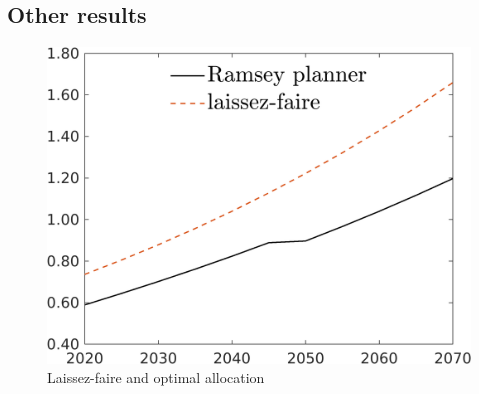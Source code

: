 \subsection{Other results}
\begin{figure}[h!!]
	\centering
	\caption{Laissez-faire and optimal allocation }\label{fig:LF}
	\begin{minipage}[]{0.32\textwidth}
		\includegraphics[width=1\textwidth]{../../codding_model/own_basedOnFried/optimalPol_190722_tidiedUp/figures/all_10Aout22/C_LFCompOPT_T_NoTaus_regime3_spillover0_noskill0_sep1_xgrowth0_etaa0.79_lgd1.png}
	\end{minipage}
\end{figure}


